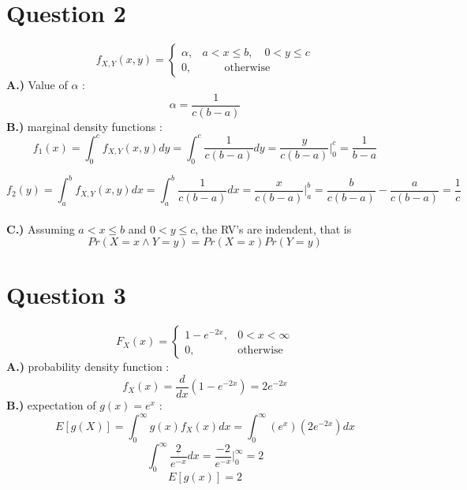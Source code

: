 \documentclass{article}
\begin{document}
\section*{Question 2}
	\[f_{X,Y}(x,y)  = \begin{cases}
    \alpha,&  a < x \leq b,\quad 0 < y \leq c\\
    0,&\quad\quad \text{otherwise}
    \end{cases}\]
    \textbf{A.)} Value of $\alpha$ :
     	\[\alpha = \frac{1}{c(b-a)}\]
	\textbf{B.)} marginal density functions :
		\[f_1(x) = \int_0^c f_{X,Y}(x,y)dy = \int_0^c \frac{1}{c(b-a)}dy =
		\frac{y}{c(b-a)}\Big|_0^c = \frac{1}{b-a}\]
	  
	  	\[f_2(y) = \int_a^b f_{X,Y}(x,y)dx = \int_a^b \frac{1}{c(b-a)}dx = 
	  	\frac{x}{c(b-a)}\Big|_a^b = \frac{b}{c(b-a)} - \frac{a}{c(b-a)} =
	  	\frac{1}{c} \]
	  \\\textbf{C.)} Assuming  \( a < x \leq b \) and \( 0 < y \leq c \), the RV's
	  are indendent, that is \[Pr( X = x \wedge Y = y) = Pr(X = x)Pr(Y = y)\]

\section*{Question 3}
	\[F_X(x) = \begin{cases}
	1 - e^{-2x},&0<x<\infty\\
	0,& \text{otherwise}\end{cases}\]
	\textbf{A.)} probability density function :
	\[f_X(x) = \frac{d}{dx}(1 - e^{-2x}) = 2e^{-2x}\]
	\textbf{B.)} expectation of $g(x) = e^{x}$ :
	\[E[g(X)] = \int_{0}^{\infty} g(x)f_X(x)dx = 
	\int_{0}^{\infty}{(e^x)(2e^{-2x})dx} \]
	\[\int_{0}^{\infty}{\frac{2}{e^{-x}}dx} = 
	\frac{-2}{e^{-x}}\Big|_0^\infty = 2\]
	\[E[g(x)] = 2\]
\end{document}
